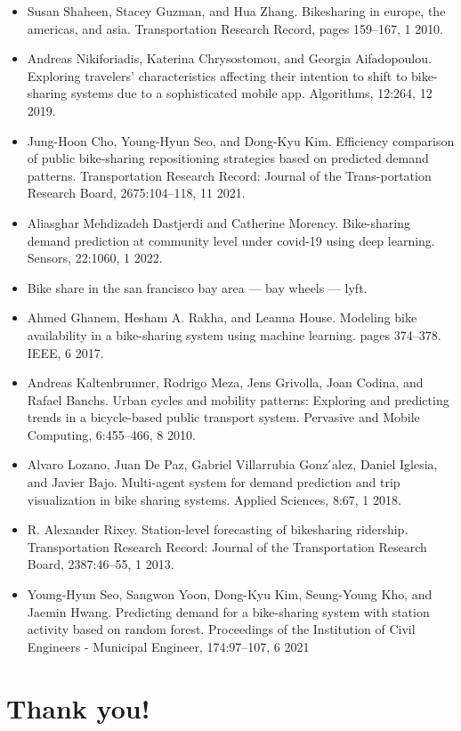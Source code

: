 \documentclass[
  ignorenonframetext,
]{beamer}
\providecommand{\tightlist}{%
  \setlength{\itemsep}{0pt}\setlength{\parskip}{0pt}}
\begin{document}
\begin{frame}{}
\protect\hypertarget{section}{}
\begin{itemize}
\tightlist
\item
  Susan Shaheen, Stacey Guzman, and Hua Zhang. Bikesharing in europe,
  the americas, and asia. Transportation Research Record, pages
  159--167, 1 2010.
\item
  Andreas Nikiforiadis, Katerina Chrysostomou, and Georgia Aifadopoulou.
  Exploring travelers' characteristics affecting their intention to
  shift to bike-sharing systems due to a sophisticated mobile app.
  Algorithms, 12:264, 12 2019.
\item
  Jung-Hoon Cho, Young-Hyun Seo, and Dong-Kyu Kim. Efficiency comparison
  of public bike-sharing repositioning strategies based on predicted
  demand patterns. Transportation Research Record: Journal of the
  Trans-portation Research Board, 2675:104--118, 11 2021.
\item
  Aliasghar Mehdizadeh Dastjerdi and Catherine Morency. Bike-sharing
  demand prediction at community level under covid-19 using deep
  learning. Sensors, 22:1060, 1 2022.
\item
  Bike share in the san francisco bay area --- bay wheels --- lyft.
\item
  Ahmed Ghanem, Hesham A. Rakha, and Leanna House. Modeling bike
  availability in a bike-sharing system using machine learning. pages
  374--378. IEEE, 6 2017.
\item
  Andreas Kaltenbrunner, Rodrigo Meza, Jens Grivolla, Joan Codina, and
  Rafael Banchs. Urban cycles and mobility patterns: Exploring and
  predicting trends in a bicycle-based public transport system.
  Pervasive and Mobile Computing, 6:455--466, 8 2010.
\item
  Alvaro Lozano, Juan De Paz, Gabriel Villarrubia Gonz ́alez, Daniel
  Iglesia, and Javier Bajo. Multi-agent system for demand prediction and
  trip visualization in bike sharing systems. Applied Sciences, 8:67, 1
  2018.
\end{itemize}
\end{frame}

\begin{frame}{}
\protect\hypertarget{section-1}{}
\begin{itemize}
\tightlist
\item
  R. Alexander Rixey. Station-level forecasting of bikesharing
  ridership. Transportation Research Record: Journal of the
  Transportation Research Board, 2387:46--55, 1 2013.
\item
  Young-Hyun Seo, Sangwon Yoon, Dong-Kyu Kim, Seung-Young Kho, and
  Jaemin Hwang. Predicting demand for a bike-sharing system with station
  activity based on random forest. Proceedings of the Institution of
  Civil Engineers - Municipal Engineer, 174:97--107, 6 2021
\end{itemize}
\end{frame}

\hypertarget{thank-you}{%
\section{Thank you!}\label{thank-you}}
\end{document}
